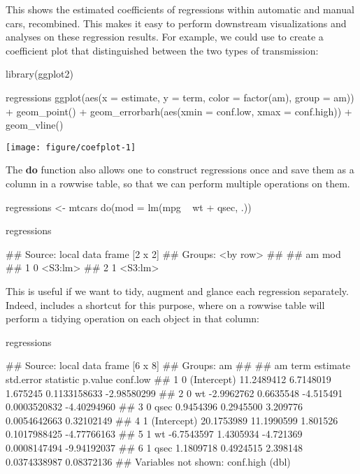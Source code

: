 This shows the estimated coefficients of regressions within automatic and manual cars, recombined. This makes it easy to perform downstream visualizations and analyses on these regression results. For example, we could use  to create a coefficient plot that distinguished between the two types of transmission:


\begin{example}
library(ggplot2)
\end{example}

\begin{example}
regressions %
    ggplot(aes(x = estimate, y = term, color = factor(am), group = am)) +
    geom_point() + geom_errorbarh(aes(xmin = conf.low, xmax = conf.high)) +
    geom_vline()
\end{example}

\texttt{[image: figure/coefplot-1]} 

The \textbf{do} function also allows one to construct regressions once and save them as a column in a rowwise table, so that we can perform multiple operations on them.


\begin{example}
regressions <- mtcars %
    do(mod = lm(mpg ~ wt + qsec, .))
\end{example}

\begin{example}
regressions
\end{example}

\begin{example}
## Source: local data frame [2 x 2]
## Groups: <by row>
## 
##   am     mod
## 1  0 <S3:lm>
## 2  1 <S3:lm>

\end{example}


This is useful if we want to tidy, augment and glance each regression separately. Indeed,  includes a shortcut for this purpose, where  on a rowwise table will perform a tidying operation on each object in that column:


\begin{example}
regressions %
\end{example}

\begin{example}
## Source: local data frame [6 x 8]
## Groups: am
## 
##   am        term   estimate  std.error statistic      p.value    conf.low
## 1  0 (Intercept) 11.2489412  6.7148019  1.675245 0.1133158633 -2.98580299
## 2  0          wt -2.9962762  0.6635548 -4.515491 0.0003520832 -4.40294960
## 3  0        qsec  0.9454396  0.2945500  3.209776 0.0054642663  0.32102149
## 4  1 (Intercept) 20.1753989 11.1990599  1.801526 0.1017988425 -4.77766163
## 5  1          wt -6.7543597  1.4305934 -4.721369 0.0008147494 -9.94192037
## 6  1        qsec  1.1809718  0.4924515  2.398148 0.0374338987  0.08372136
## Variables not shown: conf.high (dbl)

\end{example}

